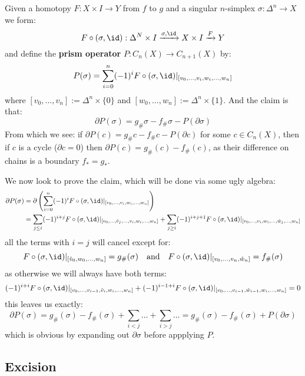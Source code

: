 \documentclass[a4paper]{article}
\begin{document}
\begin{thrm}
\begin{prf}
Given a homotopy $F:X\times I\rightarrow Y$ from $f$ to $g$ and a singular $n$-simplex $\sigma:\Delta^n\rightarrow X$ we form:\[
    F\circ(\sigma,\id):\Delta^N\times I \xrightarrow{\sigma,\id} X\times I \xrightarrow{F} Y
\]
and define the \textbf{prism operator} $P:C_n(X)\rightarrow C_{n+1}(X)$ by:\[
    P(\sigma)=\sum_{i=0}^n (-1)^i F\circ(\sigma,\id)\vert_{[v_0,\ldots,v_i,w_i,\ldots,w_n]}
\]
where $[v_0,\ldots,v_n]:= \Delta^n\times\{0\}$ and $[w_0,\ldots,w_n]:= \Delta^n\times\{1\}$.
And the claim is that: \[
    \partial P(\sigma) = g_\#\sigma-f_\#\sigma-P(\partial\sigma)
\]
From which we see: if $\partial P(c) = g_\#c-f_\#c-P(\partial c)$ for some $c\in C_n(X)$, then if $c$ is a cycle ($\partial c=0$) then $\partial P(c) = g_\#(c)-f_\#(c)$, as their difference on chains is a boundary $f_*=g_*$.

We now look to prove the claim, which will be done via some ugly algebra:\begin{align*}
    \partial P(\sigma) &= \partial\pr{\sum_{i=0}^n (-1)^i F\circ(\sigma,\id)\vert_{[v_0,\ldots,v_i,w_i,\ldots,w_n]}} \\
    &= \sum_{j\leq i} (-1)^{i+j } F\circ(\sigma,\id)\vert_{[v_0,\ldots,\hat{v}_j,\ldots,v_i,w_i,\ldots,w_n]} + 
    \sum_{j\geq i} (-1)^{i+j+1} F\circ(\sigma,\id)\vert_{[v_0,\ldots,v_i,w_i,\ldots,\hat{w}_j,\ldots,w_n]}
\end{align*}
all the terms with $i=j$ will cancel except for:\[
    F\circ(\sigma,\id)\vert_{[\hat{v}_0,w_0,\ldots,w_n]} =g_\#(\sigma)
    \quad \text{and} \quad 
    F\circ(\sigma,\id)\vert_{[v_0,\ldots,v_n,\hat{w}_n]} = f_\#(\sigma)
\]
as otherwise we will always have both terms:\[
    (-1)^{i+i}F\circ(\sigma,\id)\vert_{[v_0,\ldots,v_{i-1},\hat{v}_i,w_i,\ldots,w_n]} + 
    (-1)^{i-1+i}F\circ(\sigma,\id)\vert_{[v_0,\ldots,v_{i-1},\hat{w}_{i-1},w_i,\ldots,w_n]} = 0
\]
this leaves us exactly:\[
    \partial P(\sigma) = g_\#(\sigma) - f_\#(\sigma) + \sum_{i<j}\ldots + \sum_{i>j}\ldots = g_\#(\sigma)-f_\#(\sigma) + P(\partial \sigma)
\]
which is obvious by expanding out $\partial \sigma$ before appplying $P$.
\end{prf}
\end{thrm}


\subsection{Excision}




\end{document}
